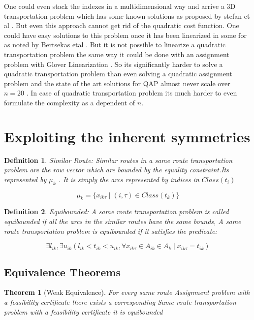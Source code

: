 \documentclass[a4paper]{article}
\newtheorem{definition}{Definition}[section]
\newtheorem{theorem}{Theorem}
\begin{document}
    One could even stack the indexes in a multidimensional way and arrive a 3D transportation problem which has some known solutions as proposed by stefan et al . \cite{Stefan} But even this approach cannot get rid of the quadratic cost function. One could have easy solutions to this problem once it has been linearized in some for as noted by Bertsekas etal \cite{4739098} . But it is not possible to linearize a quadratic  transportation problem the same way it could be done with an assignment problem with Glover Linearization \cite{GUEYE20091255}. So its significantly harder to solve a quadratic transportation problem than even solving a quadratic assignment problem and the state of the art solutions for QAP almost never scale over $n=20$ \cite{BURKARD1991115}. In case of quadratic transportation problem its much harder to even formulate the complexity as a dependent of $n$.
    
        
    \section{Exploiting the inherent symmetries}
    \theoremstyle{definition}
    \begin{definition}{Similar Route:}
    Similar routes in a same route transportation problem are the row vector which are bounded by the equality constraint.Its represented by $\mu_k$ . It is simply the arcs represented by indices in $Class(t_{i})$
    \end{definition}
    
    $$\mu_k = \{x_{ik\tau} \mid (i,\tau) \in Class(t_{k})\}$$
    
    \begin{definition}{Equibounded:}
    A same route transportation problem is called equibounded if all the arcs in the similar routes have the same bounds, A same route transportation problem is equibounded if it satisfies the predicate:
    \end{definition}
    $$\exists l_{ik},\exists u_{ik}(l_{ik}<t_{ik}<u_{ik}, \forall x_{ik\tau} \in A_{ik} \in A_k \mid x_{ik\tau}  =  t_{ik})$$
    \subsection{Equivalence Theorems}
    \begin{theorem}[Weak Equivalence] \label{thm:we}
    For every same route Assignment problem with a feasibility certificate there exists a corresponding Same route transportation problem with a feasibility certificate it is equibounded
    \end{theorem}
    
\end{document}
